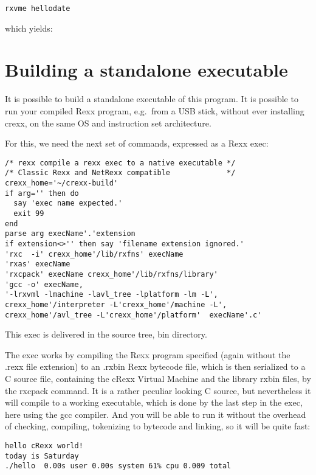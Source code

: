 \begin{verbatim}
rxvme hellodate
\end{verbatim}

which yields:

\begin{shaded}
  \small
\obeylines {}
\end{shaded}

\hypertarget{building-a-standalone-executable}{%
\section{Building a standalone
executable}\label{building-a-standalone-executable}}

It is possible to build a standalone executable of this program. It is
possible to run your compiled Rexx program, e.g.~from a USB stick,
without ever installing crexx, on the same OS and instruction set
architecture.

For this, we need the next set of commands, expressed as a Rexx exec:

\begin{verbatim}
/* rexx compile a rexx exec to a native executable */
/* Classic Rexx and NetRexx compatible             */
crexx_home='~/crexx-build'
if arg='' then do
  say 'exec name expected.'
  exit 99
end
parse arg execName'.'extension
if extension<>'' then say 'filename extension ignored.'
'rxc  -i' crexx_home'/lib/rxfns' execName
'rxas' execName
'rxcpack' execName crexx_home'/lib/rxfns/library'
'gcc -o' execName,
'-lrxvml -lmachine -lavl_tree -lplatform -lm -L',
crexx_home'/interpreter -L'crexx_home'/machine -L',
crexx_home'/avl_tree -L'crexx_home'/platform'  execName'.c'
\end{verbatim}

This exec is delivered in the source tree, bin directory.

The exec works by compiling the Rexx program specified (again without
the .rexx file extension) to an .rxbin Rexx bytecode file, which is then
serialized to a C source file, containing the cRexx Virtual Machine and
the library rxbin files, by the rxcpack command. It is a rather peculiar
looking C source, but nevertheless it will compile to a working
executable, which is done by the last step in the exec, here using the
gcc compiler. And you will be able to run it without the overhead of
checking, compiling, tokenizing to bytecode and linking, so it will be
quite fast:

\begin{verbatim}
hello cRexx world!
today is Saturday
./hello  0.00s user 0.00s system 61% cpu 0.009 total
\end{verbatim}
